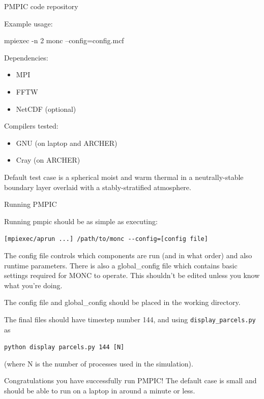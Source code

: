 \documentclass{beamer}
\providecommand{\tightlist}{%
  \setlength{\itemsep}{0pt}\setlength{\parskip}{0pt}}
\begin{document}
\begin{frame}{PMPIC code repository}
\protect\hypertarget{pmpic-code-repository}{}

Example usage:

mpiexec -n 2 monc --config=config.mcf

Dependencies:

\begin{itemize}
\tightlist
\item
  MPI
\item
  FFTW
\item
  NetCDF (optional)
\end{itemize}

Compilers tested:

\begin{itemize}
\tightlist
\item
  GNU (on laptop and ARCHER)
\item
  Cray (on ARCHER)
\end{itemize}

\end{frame}

\begin{frame}
Default test case is a spherical moist and
warm thermal in a neutrally-stable boundary layer overlaid with a
stably-stratified atmosphere. 
\end{frame}

\begin{frame}[fragile]{Running PMPIC}
\protect\hypertarget{running-pmpic}{}

Running pmpic should be as simple as executing:

\texttt{{[}mpiexec/aprun\ ...{]}\ /path/to/monc\ -\/-config={[}config\ file{]}}

The config file controls which components are run (and in what order)
and also runtime parameters. There is also a global\_config file which
contains basic settings required for MONC to operate. This shouldn't be
edited unless you know what you're doing.

The config file and global\_config should be placed in the working
directory.

The final files should have timestep number 144, and using
\texttt{display\_parcels.py} as

\texttt{python\ display\ parcels.py\ 144\ {[}N{]}}

(where N is the number of processes used in the simulation).

Congratulations you have successfully run PMPIC! The default case is small and should be able to run on a laptop in around a minute or less.

\end{frame}
\end{document}
